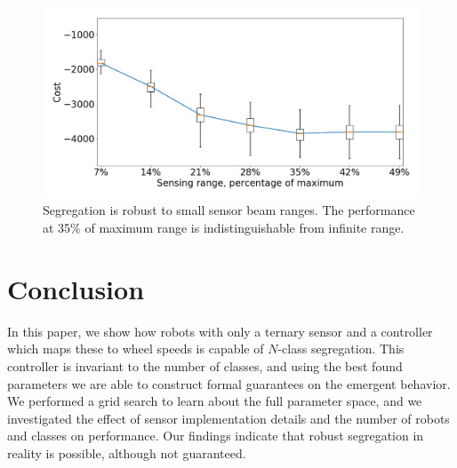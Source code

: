 \documentclass[letterpaper, 10 pt, conference]{ieeeconf}
\begin{document}
\begin{figure}[t]
  \centering
  \includegraphics[width=1\linewidth]{./images/beam_length.png}
  \caption{Segregation is robust to small sensor beam ranges. The performance at 35\% of maximum range is indistinguishable from infinite range.}
  \label{fig:beam_range}
\end{figure}

\section{Conclusion}

In this paper, we show how robots with only a ternary sensor and a controller
which maps these to wheel speeds is capable of $N$-class segregation.
This controller is invariant to the number of classes, and using the best found parameters
we are able to construct formal guarantees on the emergent behavior.
We performed a grid search to learn about the full parameter space,
and we investigated the effect of sensor implementation
details and the number of robots and classes on performance. Our findings
indicate that robust segregation in reality is possible, although not
guaranteed.



\end{document}
